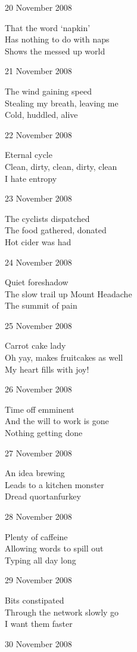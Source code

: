 \documentclass[12pt]{article}
\begin{document}
20 November 2008

That the word `napkin' \\
Has nothing to do with naps \\
Shows the messed up world

21 November 2008

The wind gaining speed \\
Stealing my breath, leaving me \\
Cold, huddled, alive

22 November 2008

Eternal cycle \\
Clean, dirty, clean, dirty, clean \\
I hate entropy

23 November 2008

The cyclists dispatched \\
The food gathered, donated \\
Hot cider was had

\newpage

24 November 2008

Quiet foreshadow \\
The slow trail up Mount Headache \\
The summit of pain

25 November 2008

Carrot cake lady \\
Oh yay, makes fruitcakes as well \\
My heart fills with joy!

26 November 2008

Time off emminent \\
And the will to work is gone \\
Nothing getting done

27 November 2008

An idea brewing \\
Leads to a kitchen monster \\
Dread quortanfurkey

28 November 2008

Plenty of caffeine \\
Allowing words to spill out \\
Typing all day long

29 November 2008

Bits constipated \\
Through the network slowly go \\
I want them faster

30 November 2008
\end{document}
